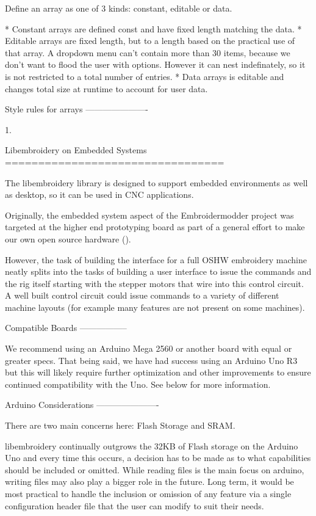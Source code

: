 \documentclass[a4paper]{report}
\begin{document}
Define an array as one of 3 kinds: constant, editable or data.

* Constant arrays are defined const and have fixed length matching the data.
* Editable arrays are fixed length, but to a length based on the practical use
  of that array. A dropdown menu can't contain more than 30 items, because we
  don't want to flood the user with options. However it can nest indefinately,
  so it is not restricted to a total number of entries.
* Data arrays is editable and changes total size at runtime to account for user data.

Style rules for arrays
----------------------

1.

Libembroidery on Embedded Systems
=================================

The libembroidery library is designed to support embedded environments as well
as desktop, so it can be used in CNC applications.

Originally, the embedded system aspect of the Embroidermodder project was
targeted at the higher end  prototyping board as part
of a general effort to make our own open source hardware ().

However, the task of building the interface for a full OSHW embroidery machine
neatly splits into the tasks of building a user interface to issue the
commands and the rig itself starting with the stepper motors that wire into
this control circuit. A well built control circuit could issue commands to
a variety of different machine layouts (for example many features are not
present on some machines).

Compatible Boards
-----------------

We recommend using an Arduino Mega 2560 or another board with equal or
greater specs. That being said, we have had success using an Arduino Uno
R3 but this will likely require further optimization and other
improvements to ensure continued compatibility with the Uno. See below
for more information.

Arduino Considerations
----------------------

There are two main concerns here: Flash Storage and SRAM.

libembroidery continually outgrows the 32KB of Flash storage on the
Arduino Uno and every time this occurs, a decision has to be made as to
what capabilities should be included or omitted. While reading files is
the main focus on arduino, writing files may also play a bigger role
in the future. Long term, it would be most practical to handle the
inclusion or omission of any feature via a single configuration header
file that the user can modify to suit their needs.
\end{document}
